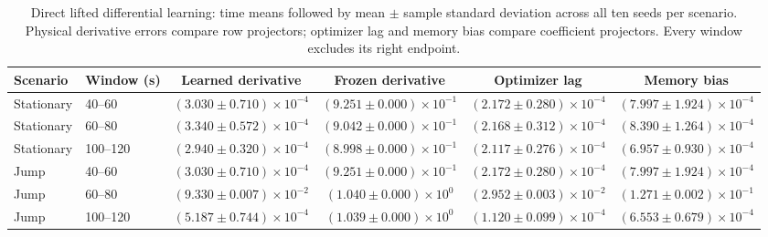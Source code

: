 \begin{table}[t]
\centering
\caption{Direct lifted differential learning: time means followed by mean $\pm$ sample standard deviation across all ten seeds per scenario. Physical derivative errors compare row projectors; optimizer lag and memory bias compare coefficient projectors. Every window excludes its right endpoint.}
\label{tab:direct_lift_results}
\begin{tabular}{llcccc}
\toprule
Scenario & Window (s) & Learned derivative & Frozen derivative & Optimizer lag & Memory bias\\
\midrule
Stationary & 40--60 & $(3.030\pm0.710)\times10^{-4}$ & $(9.251\pm0.000)\times10^{-1}$ & $(2.172\pm0.280)\times10^{-4}$ & $(7.997\pm1.924)\times10^{-4}$\\
Stationary & 60--80 & $(3.340\pm0.572)\times10^{-4}$ & $(9.042\pm0.000)\times10^{-1}$ & $(2.168\pm0.312)\times10^{-4}$ & $(8.390\pm1.264)\times10^{-4}$\\
Stationary & 100--120 & $(2.940\pm0.320)\times10^{-4}$ & $(8.998\pm0.000)\times10^{-1}$ & $(2.117\pm0.276)\times10^{-4}$ & $(6.957\pm0.930)\times10^{-4}$\\
\midrule
Jump & 40--60 & $(3.030\pm0.710)\times10^{-4}$ & $(9.251\pm0.000)\times10^{-1}$ & $(2.172\pm0.280)\times10^{-4}$ & $(7.997\pm1.924)\times10^{-4}$\\
Jump & 60--80 & $(9.330\pm0.007)\times10^{-2}$ & $(1.040\pm0.000)\times10^{0}$ & $(2.952\pm0.003)\times10^{-2}$ & $(1.271\pm0.002)\times10^{-1}$\\
Jump & 100--120 & $(5.187\pm0.744)\times10^{-4}$ & $(1.039\pm0.000)\times10^{0}$ & $(1.120\pm0.099)\times10^{-4}$ & $(6.553\pm0.679)\times10^{-4}$\\
\bottomrule
\end{tabular}
\end{table}
